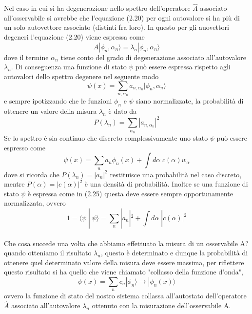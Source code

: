 \noindent Nel caso in cui si ha degenerazione nello spettro dell'operatore $\hat{A}$ associato all'osservabile si avrebbe che l'equazione (2.20) per ogni autovalore si ha pi\`u di un solo autovettore associato (distinti fra loro).
In questo per gli auovettori degeneri l'equazione (2.20) viene espressa come 
\begin{equation}
	\hat{A}|\phi_n,\alpha_n\rangle = \lambda_n |\phi_n, \alpha_n\rangle  
\end{equation}
dove il termine $\alpha_n$ tiene conto del grado di degenerazione associato all'autovalore $\lambda_n$.
Di conseguenza una funzione di stato $\psi$ pu\`o essere espressa rispetto agli autovalori dello spettro degenere nel seguente modo
\begin{equation}
	\psi(x) =\sum_{n,\alpha_n}a_{n,\alpha_n}|\phi_n,\alpha_n\rangle 
\end{equation}
e sempre ipotizzando che le funzioni $\phi_n$ e $\psi$ siano normalizzate, la probabilit\`a di ottenere un valore della misura $\lambda_n$ \`e dato da 
\begin{equation}
	P(\lambda_n) = \sum_{\alpha_n}|a_{n,\alpha_n}|^2
\end{equation}
Se lo spettro \`e sia continuo che discreto complessivamente uno stato $\psi$ pu\`o essere espresso come
\begin{equation}
	\psi(x) = \sum_{n}a_n \phi_n(x) + \int d\alpha \;c(\alpha)w_{\alpha}
\end{equation}
dove si ricorda che $P(\lambda_n) = |a_n|^2$ restituisce una probabilit\`a nel caso discreto, mentre $P(\alpha) = |c(\alpha)|^2 $ \`e una densit\`a di probabilit\`a. Inoltre se una funzione di stato $\psi$ \`e espressa come in (2.25) questa deve essere sempre opportunamente normalizzata, ovvero
\begin{equation*}
	1= \langle \psi \; | \; \psi \rangle = \sum_{n} |a_n|^2 + \int d\alpha \; |c(\alpha)|^2
\end{equation*} 
\\
\noindent Che cosa succede una volta che abbiamo effettuato la misura di un osservabile A?  quando otteniamo il risultato $\lambda_n$, questo \`e determinato e dunque la probabilit\`a di ottenere quel determinato valore della misura deve essere massima, per riflettere questo risultato si ha quello che viene chiamato "collasso della funzione d'onda", 
\begin{equation*}
	\psi(x) = \sum_{n}c_n|\phi_n\rangle  \to |\phi_n(x)\rangle 
\end{equation*}
ovvero la funzione di stato del nostro sistema collassa all'autostato dell'operatore $\hat{A}$ associato all'autovalore $\lambda_n$ ottenuto con la misurazione dell'osservabile A.
